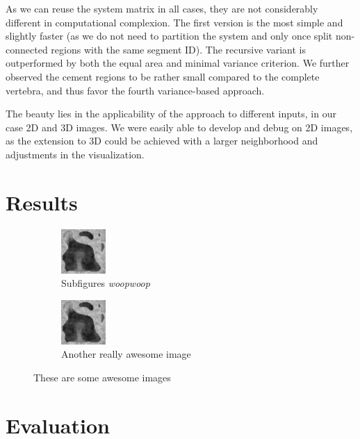 \documentclass{article}
\begin{document}
  As we can reuse the system matrix in all cases, they are not considerably different in computational complexion.
  The first version is the most simple and slightly faster (as we do not need to partition the system and only once split non-connected regions with the same segment ID).
  The recursive variant is outperformed by both the equal area and minimal variance criterion.
  We further observed the cement regions to be rather small compared to the complete vertebra, and thus favor the fourth variance-based approach.
  
  The beauty lies in the applicability of the approach to different inputs, in our case 2D and 3D images.
  We were easily able to develop and debug on 2D images, as the extension to 3D could be achieved with a larger neighborhood and adjustments in the visualization.
  
  
  \section{Results}
  {
    \begin{figure}[h]
      \centering
      \begin{subfigure}[t]{0.45\linewidth}
        \centering
        \includegraphics{test.png}
        \caption{Subfigures \textit{woopwoop}}
      \end{subfigure}
      \hfill
      \begin{subfigure}[t]{0.45\linewidth}
        \centering
        \includegraphics{test.png}
        \caption{Another really awesome image}
      \end{subfigure}
      \caption{These are some awesome images}
    \end{figure}
  }
  \pagebreak
  \section{Evaluation}
  
\end{document}
